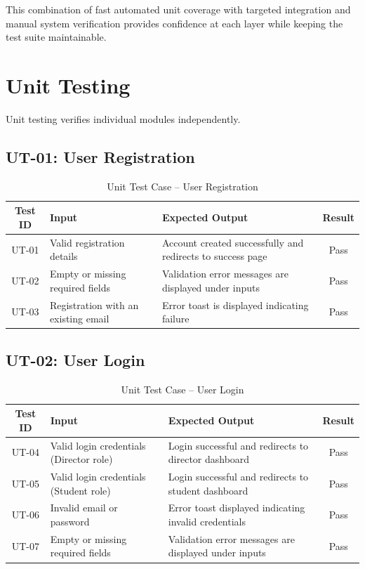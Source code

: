 This combination of fast automated unit coverage with targeted integration and manual system
verification provides confidence at each layer while keeping the test suite maintainable.


\section{Unit Testing}

Unit testing verifies individual modules independently.

\subsection{UT-01: User Registration}

\begin{table}[H]
\centering
\caption{Unit Test Case – User Registration}
\begin{tabularx}{\textwidth}{|c|X|X|c|}
\hline
\textbf{Test ID} & \textbf{Input} & \textbf{Expected Output} & \textbf{Result} \\
\hline
UT-01 & Valid registration details & Account created successfully and redirects to success page & Pass \\
\hline
UT-02 & Empty or missing required fields & Validation error messages are displayed under inputs & Pass \\
\hline
UT-03 & Registration with an existing email & Error toast is displayed indicating failure & Pass \\
\hline
\end{tabularx}
\end{table}

\subsection{UT-02: User Login}

\begin{table}[H]
\centering
\caption{Unit Test Case – User Login}
\begin{tabularx}{\textwidth}{|c|X|X|c|}
\hline
\textbf{Test ID} & \textbf{Input} & \textbf{Expected Output} & \textbf{Result} \\
\hline
UT-04 & Valid login credentials (Director role) & Login successful and redirects to director dashboard & Pass \\
\hline
UT-05 & Valid login credentials (Student role) & Login successful and redirects to student dashboard & Pass \\
\hline
UT-06 & Invalid email or password & Error toast displayed indicating invalid credentials & Pass \\
\hline
UT-07 & Empty or missing required fields & Validation error messages are displayed under inputs & Pass \\
\hline
\end{tabularx}
\end{table}

